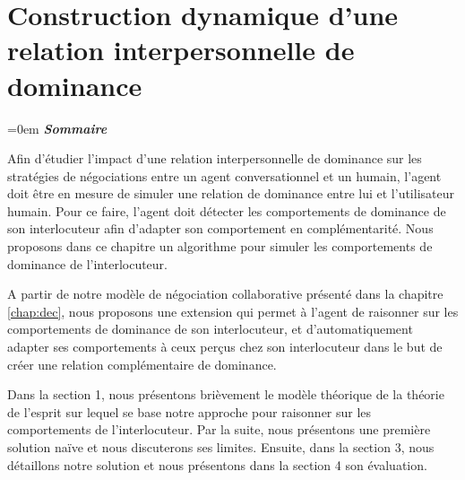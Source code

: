 \chapter[Relation interpersonnelle de dominance]{Construction dynamique d'une relation interpersonnelle de dominance}
\label{chap:Tom}
\begingroup
\parindent=0em
\emph{\textbf{Sommaire}}
\localtableofcontents 
\clearpage
\endgroup

Afin d'étudier l'impact d'une relation interpersonnelle de dominance sur les stratégies de négociations entre un agent conversationnel et un humain, l'agent doit être en mesure de simuler une relation de dominance entre lui et l'utilisateur humain. Pour ce faire, l'agent doit détecter les comportements de dominance de son interlocuteur afin d'adapter son comportement en complémentarité. Nous proposons dans ce chapitre un algorithme pour simuler les comportements de dominance de l'interlocuteur. 

A partir de notre modèle de négociation collaborative présenté dans la chapitre \ref{chap:dec}, nous proposons une extension qui permet à l'agent de raisonner sur les comportements de dominance de son interlocuteur, et d'automatiquement adapter ses comportements à ceux perçus chez son interlocuteur dans le but de créer une relation complémentaire de dominance.

Dans la section 1, nous présentons brièvement le modèle théorique de la théorie de l'esprit sur lequel se base notre approche pour raisonner sur les comportements de l'interlocuteur. Par la suite, nous présentons une première solution naïve et nous discuterons ses limites. Ensuite, dans la section 3, nous détaillons notre solution et nous présentons dans la section 4 son évaluation.  




